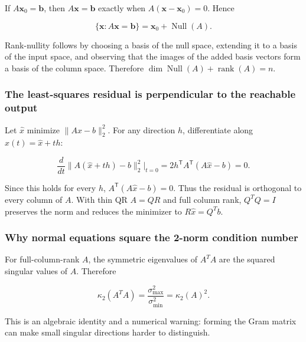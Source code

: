 If \(A\mathbf x_0=\mathbf b\), then \(A\mathbf x=\mathbf b\) exactly when \(A(\mathbf x-\mathbf x_0)=0\). Hence

\[
\{\mathbf x:A\mathbf x=\mathbf b\}=\mathbf x_0+\operatorname{Null}(A).
\]

Rank-nullity follows by choosing a basis of the null space, extending it to a basis of the input space, and observing that the images of the added basis vectors form a basis of the column space. Therefore \(\dim\operatorname{Null}(A)+\operatorname{rank}(A)=n\).

\subsubsection{The least-squares residual is perpendicular to the reachable output}\label{02-foundations-ii-ch039-the-least-squares-residual-is-perpendicular-to-the-reachable-output}

\hypertarget{02-foundations-ii-ch039-the-least-squares-residual-is-perpendicular-to-the-reachable-output}{}

Let \(\widehat x\) minimize \(\|Ax-b\|_2^2\). For any direction \(h\), differentiate along \(x(t)=\widehat x+th\):

\[
\frac{d}{dt}\|A(\widehat x+th)-b\|_2^2\bigg|_{t=0}
=2h^\mathsf T A^\mathsf T(A\widehat x-b)=0.
\]

Since this holds for every \(h\), \(A^\mathsf T(A\widehat x-b)=0\). Thus the residual is orthogonal to every column of \(A\). With thin QR \(A=QR\) and full column rank, \(Q^TQ=I\) preserves the norm and reduces the minimizer to \(R\widehat x=Q^Tb\).

\subsubsection{Why normal equations square the 2-norm condition number}\label{02-foundations-ii-ch039-why-normal-equations-square-the-2-norm-condition-number}

\hypertarget{02-foundations-ii-ch039-why-normal-equations-square-the-2-norm-condition-number}{}

For full-column-rank \(A\), the symmetric eigenvalues of \(A^TA\) are the squared singular values of \(A\). Therefore

\[
\kappa_2(A^TA)=\frac{\sigma_{\max}^2}{\sigma_{\min}^2}=\kappa_2(A)^2.
\]

This is an algebraic identity and a numerical warning: forming the Gram matrix can make small singular directions harder to distinguish.


